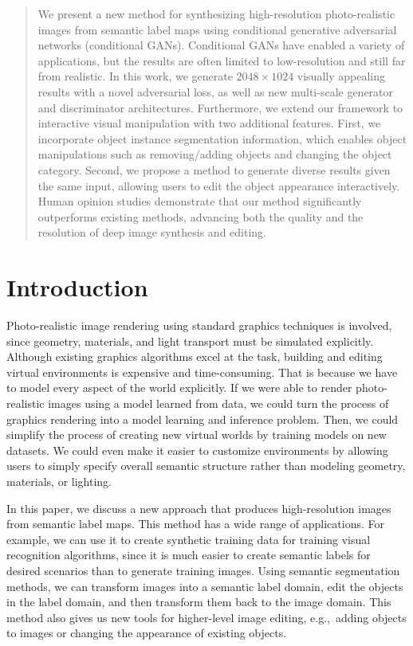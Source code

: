 \documentclass[10pt,twocolumn,letterpaper]{article}
\newcommand{\lblsec}[1]{\label{sec:#1}}
\begin{document}
\begin{abstract}
\vspace{-.1in}
We present a new method for synthesizing high-resolution photo-realistic images from semantic label maps using conditional generative adversarial networks (conditional GANs). Conditional GANs have enabled a variety of applications, but the results are often limited to low-resolution and still far from realistic. In this work, we generate $2048\times1024$ visually appealing results with a novel adversarial loss, as well as new multi-scale generator and discriminator architectures. Furthermore, we extend our framework to interactive visual manipulation with two additional features. First, we incorporate object instance segmentation information, which enables object manipulations such as removing/adding objects and changing the object category. Second, we propose a method to generate diverse results given the same input, allowing users to edit the object appearance interactively. Human opinion studies demonstrate that our method significantly outperforms existing methods, advancing both the quality and the resolution of deep image synthesis and editing.
\end{abstract}

\vspace{-.2in}
\section{Introduction} \lblsec{intro}

Photo-realistic image rendering using standard graphics techniques is involved, since geometry, materials, and light transport must be simulated explicitly. Although existing graphics algorithms excel at the task, building and editing virtual environments is expensive and time-consuming. That is because we have to model every aspect of the world explicitly. If we were able to render photo-realistic images using a model learned from data, we could turn the process of graphics rendering into a model learning and inference problem. Then, we could simplify the process of creating new virtual worlds by training models on new datasets. We could even make it easier to customize environments by allowing users to simply specify overall semantic structure rather than modeling geometry, materials, or lighting. 

In this paper, we discuss a new approach that produces high-resolution images from semantic label maps. This method has a wide range of applications. For example, we can use it to create synthetic training data for training visual recognition algorithms, since it is much easier to create semantic labels for desired scenarios than to generate training images. Using semantic segmentation methods, we can transform images into a semantic label domain, edit the objects in the label domain, and then transform them back to the image domain. This method also gives us new tools for higher-level image editing, e.g.,\ adding objects to images or changing the appearance of existing objects.
\end{document}
